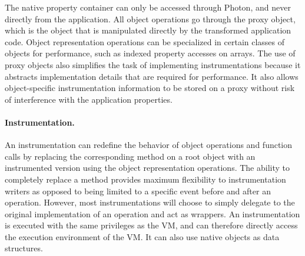 %
The native property container can only be accessed through Photon, and never
directly from the application. All object operations go through the proxy
object, which is the object that is manipulated directly by the transformed
application code.  Object representation operations can be specialized in
certain classes of objects for performance, such as indexed property accesses
on arrays. The use of proxy objects also simplifies the task of implementing
instrumentations because it abstracts implementation details that are required
for performance.  It also allows object-specific instrumentation information to
be stored on a proxy without risk of interference with the application
properties.


\paragraph{Instrumentation.} An instrumentation can redefine the behavior of
object operations and function calls by replacing the corresponding method on a
root object with an instrumented version using the object representation
operations. The ability to completely replace a method provides maximum
flexibility to instrumentation writers as opposed to being limited to a
specific event before and after an operation. However, most instrumentations
will choose to simply delegate to the original implementation of an operation
and act as wrappers. An instrumentation is executed with the same privileges as
the VM, and can therefore directly access the execution environment of the VM.
It can also use native objects as data structures.

